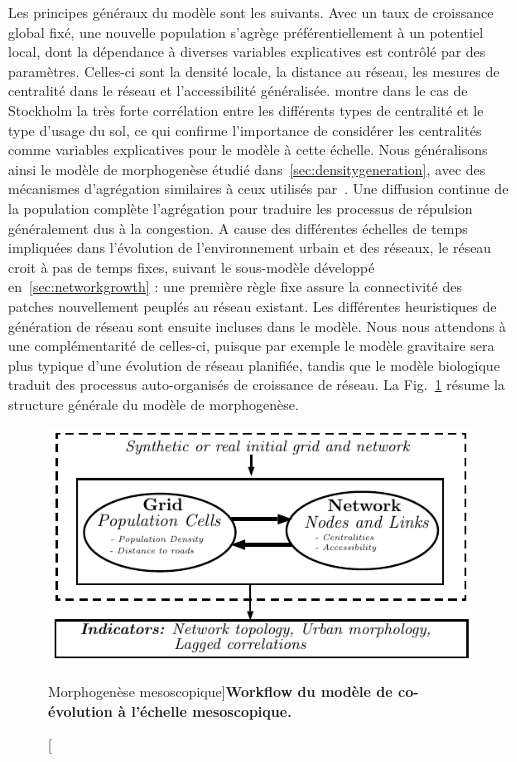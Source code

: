 {Les principes généraux du modèle sont les suivants. Avec un taux de croissance global fixé, une nouvelle population s'agrège préférentiellement à un potentiel local, dont la dépendance à diverses variables explicatives est contrôlé par des paramètres. Celles-ci sont la densité locale, la distance au réseau, les mesures de centralité dans le réseau et l'accessibilité généralisée. \cite{doi:10.1080/13658816.2014.893347} montre dans le cas de Stockholm la très forte corrélation entre les différents types de centralité et le type d'usage du sol, ce qui confirme l'importance de considérer les centralités comme variables explicatives pour le modèle à cette échelle. Nous généralisons ainsi le modèle de morphogenèse étudié dans~\ref{sec:densitygeneration}, avec des mécanismes d'agrégation similaires à ceux utilisés par~\cite{raimbault2014hybrid}. Une diffusion continue de la population complète l'agrégation pour traduire les processus de répulsion généralement dus à la congestion. A cause des différentes échelles de temps impliquées dans l'évolution de l'environnement urbain et des réseaux, le réseau croit à pas de temps fixes, suivant le sous-modèle développé en~\ref{sec:networkgrowth} : une première règle fixe assure la connectivité des patches nouvellement peuplés au réseau existant. Les différentes heuristiques de génération de réseau sont ensuite incluses dans le modèle. Nous nous attendons à une complémentarité de celles-ci, puisque par exemple le modèle gravitaire sera plus typique d'une évolution de réseau planifiée, tandis que le modèle biologique traduit des processus auto-organisés de croissance de réseau. La Fig.~\ref{fig:mesocoevolmodel:workflow} résume la structure générale du modèle de morphogenèse.
}




\begin{figure}
	\includegraphics[width=\linewidth]{Figures/MesoCoEvol/mesocoevol}
	\caption[][Morphogenèse mesoscopique]{}{\textbf{Workflow du modèle de co-évolution à l'échelle mesoscopique.}\label{fig:mesocoevolmodel:workflow}}
\end{figure}



